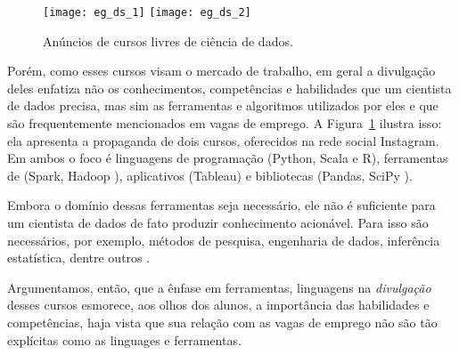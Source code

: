 \begin{figure}
	\centering

	\texttt{[image: eg\_ds\_1]}\hfill
	\texttt{[image: eg\_ds\_2]}

	\caption{Anúncios de cursos livres de ciência de dados.}
	\label{fig:cursos}
\end{figure}

Porém, como esses cursos visam o mercado de trabalho, em geral a divulgação deles enfatiza não os conhecimentos, competências e habilidades que um cientista de dados precisa, mas sim as ferramentas e algoritmos utilizados por eles e que são frequentemente mencionados em vagas de emprego.
A Figura~\ref{fig:cursos} ilustra isso: ela apresenta a propaganda de dois cursos, oferecidos na rede social Instagram.
Em ambos o foco é linguagens de programação (Python, Scala e R), ferramentas de  (Spark, Hadoop \etc), aplicativos (Tableau) e bibliotecas (Pandas, SciPy \etc).

Embora o domínio dessas ferramentas seja necessário, ele não é suficiente para um cientista de dados de fato produzir conhecimento acionável.
Para isso são necessários, por exemplo, métodos de pesquisa, engenharia de dados, inferência estatística, dentre outros \cite[p.~15]{CF-DS-Release2019}.

Argumentamos, então, que a ênfase em ferramentas, linguagens \etc na \emph{divulgação} desses cursos esmorece, aos olhos dos alunos, a importância das habilidades e competências, haja vista que sua relação com as vagas de emprego não são tão explícitas como as linguages e ferramentas.